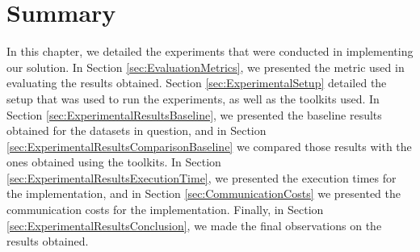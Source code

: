 

\section{Summary}
\label{sec:SummaryEvaluation}


In this chapter, we detailed the experiments that were conducted in implementing our solution. In Section \ref{sec:EvaluationMetrics}, we presented the metric used in evaluating the results obtained.
Section \ref{sec:ExperimentalSetup} detailed the setup that was used to run the experiments, as well as the toolkits used.
In Section \ref{sec:ExperimentalResultsBaseline}, we presented the baseline results obtained for the datasets in question, and in Section \ref{sec:ExperimentalResultsComparisonBaseline} we compared those results with the ones obtained using the toolkits.
In Section \ref{sec:ExperimentalResultsExecutionTime}, we presented the execution times for the implementation, and in Section \ref{sec:CommunicationCosts} we presented the communication costs for the implementation.
Finally, in Section \ref{sec:ExperimentalResultsConclusion}, we made the final observations on the results obtained.


